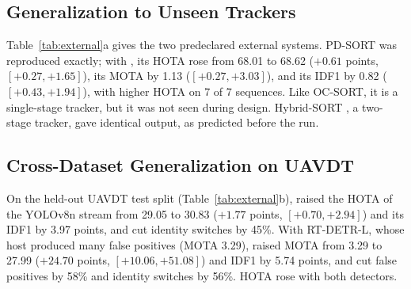 \subsection{Generalization to Unseen Trackers}\label{sec:external}
Table~\ref{tab:external}a gives the two predeclared external systems. PD-SORT \cite{wang2025pdsort}
was reproduced exactly; with \scl{}, its HOTA rose from 68.01 to 68.62 ($+0.61$ points,
$[+0.27,+1.65]$), its MOTA by 1.13 ($[+0.27,+3.03]$), and its IDF1 by 0.82 ($[+0.43,+1.94]$), with
higher HOTA on 7 of 7 sequences. Like OC-SORT, it is a single-stage tracker, but it was not seen
during design. Hybrid-SORT \cite{yang2024hybridsort}, a two-stage tracker, gave identical output, as
predicted before the run.



\subsection{Cross-Dataset Generalization on UAVDT}\label{sec:visdrone}
On the held-out UAVDT test split (Table~\ref{tab:external}b), \scl{} raised the HOTA of the YOLOv8n
stream from 29.05 to 30.83 ($+1.77$ points, $[+0.70,+2.94]$) and its IDF1 by 3.97 points, and cut
identity switches by 45\%. With RT-DETR-L, whose host produced many false positives (MOTA 3.29),
\scl{} raised MOTA from 3.29 to 27.99 ($+24.70$ points, $[+10.06,+51.08]$) and IDF1 by 5.74 points,
and cut false positives by 58\% and identity switches by 56\%. HOTA rose with both detectors.

